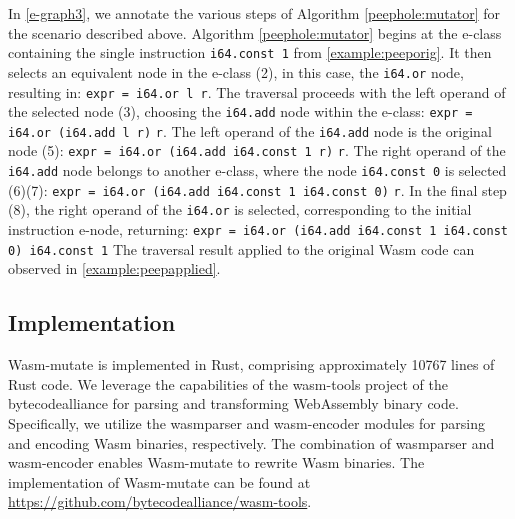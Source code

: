 \documentclass[sigplan,screen]{acmart}
\newcommand*\badge[1]{ \colorbox{red}{\color{white}#1}}
\newcommand{\tool}{Wasm-mutate\xspace}
\newcommand{\todo}[1]{%
\refstepcounter{todo}
\noindent\textbf{\badge{TODO}} {\color{red}#1}
\addcontentsline{td}{todo}
{\color{red}\thesection.\thetodo\xspace #1}}
\begin{document}
In \autoref{e-graph3}, we annotate the various steps of Algorithm \ref{peephole:mutator} 
for the scenario  described above. Algorithm \ref{peephole:mutator} begins at the e-class containing the single instruction \texttt{i64.const 1} from \autoref{example:peeporig}. 
It then selects an equivalent node in the e-class (2), in this case, the \texttt{i64.or} node, resulting in:
{\texttt{expr = i64.or l r}}.
The traversal proceeds with the left operand of the selected node (3), choosing the \texttt{i64.add} node within the e-class: 
{\texttt{expr = i64.or (i64.add l r)} \texttt{r}}.
The left operand of the \texttt{i64.add} node is the original node (5): 
{\texttt{expr = i64.or (i64.add i64.const 1 r)} \texttt{r}}.
The right operand of the \texttt{i64.add} node belongs to another e-class, where the node \texttt{i64.const 0} is selected (6)(7):
{\texttt{expr = i64.or (i64.add i64.const 1 i64.const 0)} \texttt{r}}.
In the final step (8), the right operand of the \texttt{i64.or} is selected, corresponding to the initial instruction e-node, returning:
{\texttt{expr = i64.or (i64.add i64.const 1 i64.const 0)\ i64.const 1}}
The traversal result applied to the original Wasm code can observed in \autoref{example:peepapplied}. 

\subsection{Implementation}

\tool is implemented in Rust, comprising approximately 10767 lines of Rust code. 
We leverage the capabilities of the wasm-tools project of the bytecodealliance for parsing and transforming WebAssembly binary code. 
Specifically, we utilize the wasmparser and wasm-encoder modules for parsing and encoding Wasm binaries, respectively.
The combination of wasmparser and wasm-encoder enables \tool to rewrite Wasm binaries. 
The implementation of \tool can be found at \url{https://github.com/bytecodealliance/wasm-tools}.




\end{document}
